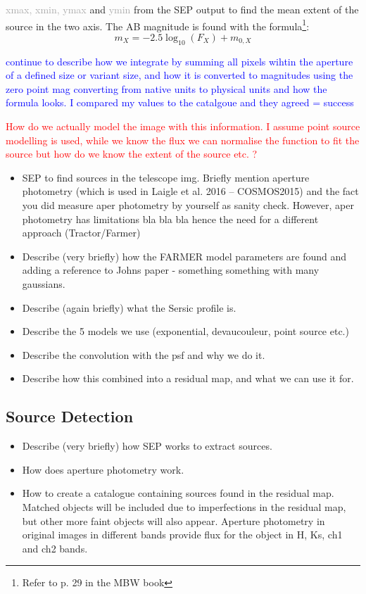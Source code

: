 \textcolor{darkgray}{xmax, xmin, ymax} and \textcolor{darkgray}{ymin} from the SEP output to find the mean extent of the source in the two axis. The AB magnitude is found with the formula\footnote{Refer to p. 29 in the MBW book}:
\begin{equation}
    m_X = -2.5\log_{10}(F_X) + m_{0,X}
\end{equation}



\textcolor{blue}{continue to describe how we integrate by summing all pixels wihtin the aperture of a defined size or variant size, and how it is converted to magnitudes using the zero point mag converting from native units to physical units and how the formula looks. I compared my values to the catalgoue and they agreed = success} 


\textcolor{red}{How do we actually model the image with this information. I assume point source modelling is used, while we know the flux we can normalise the function to fit the source but how do we know the extent of the source etc. ?}


\begin{itemize}
    \item SEP to find sources in the telescope img. Briefly mention aperture photometry (which is used in Laigle et al. 2016 -- COSMOS2015) and the fact you did measure aper photometry by yourself as sanity check. However, aper photometry has limitations bla bla bla hence the need for a different approach (Tractor/Farmer)
    \item Describe (very briefly) how the FARMER model parameters are found and adding a reference to Johns paper - something something with many gaussians. 
    \item Describe (again briefly) what the Sersic profile is.
    \item Describe the 5 models we use (exponential, devaucouleur, point source etc.)
    \item Describe the convolution with the psf and why we do it.
    \item Describe how this combined into a residual map, and what we can use it for.
\end{itemize}

\subsection{Source Detection}
\begin{itemize}
    \item Describe (very briefly) how SEP works to extract sources.
    \item How does aperture photometry work.
    \item How to create a catalogue containing sources found in the residual map. Matched objects will be included due to imperfections in the residual map, but other more faint objects will also appear. Aperture photometry in original images in different bands provide flux for the object in H, Ks, ch1 and ch2 bands.
\end{itemize}

